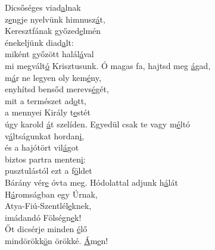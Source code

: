 \documentclass[twoside]{article}
\begin{document}
\begin{hymnstanzas}
  Dicsőséges viad\underline{a}lnak\\
  z\underline{e}ngje nyelvünk himnusz\underline{á}t,\\
  Keresztfának győzed\underline{e}lmén\\
  énekeljünk diad\underline{a}lt:\\
  miként győzött halál\underline{á}val\\
  mi megvált\underline{ó} Krisztusunk.
\stanzabreak
  Ó magas fa, hajtsd meg \underline{á}gad,\\
  m\underline{á}r ne legyen oly kem\underline{é}ny,\\
  enyhítsd bensőd merevs\underline{é}gét,\\
  mit a természet ad\underline{o}tt,\\
  a mennyei Király t\underline{e}stét\\
  úgy karold \underline{á}t szelíden.
\stanzabreak
  Egyedül csak te vagy m\underline{é}ltó\\
  v\underline{á}ltságunkat hordan\underline{i},\\
  és a hajótört vil\underline{á}got\\
  biztos partra menten\underline{i}:\\
  pusztulástól ezt a f\underline{ö}ldet\\
  Bárány vér\underline{e} óvta meg.
\stanzabreak
  Hódolattal adjunk h\underline{á}lát\\
  H\underline{á}romságban egy Úrn{a}k,\\
  Atya-Fiú-Szentlél\underline{e}knek,\\
  imádandó Fölségn\underline{e}k!\\
  Őt dicsérje minden \underline{é}lő\\
  mindörökk\underline{ö}n örökké. \underline{Á}m\underline{e}n!
\end{hymnstanzas}





\end{document}
